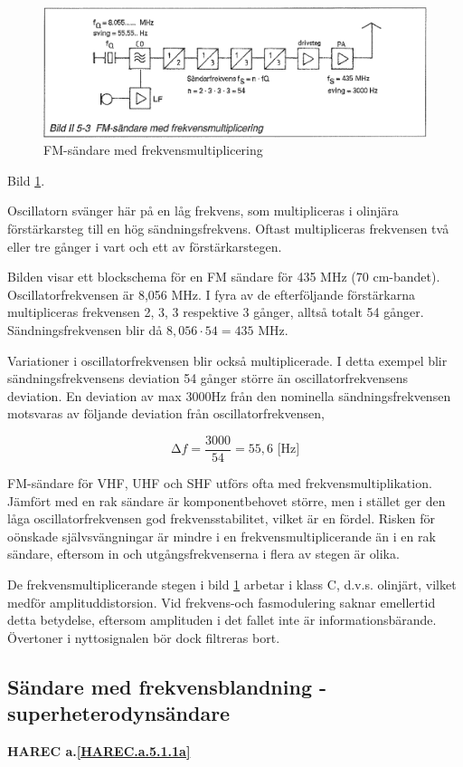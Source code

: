 \begin{figure}
  \includegraphics[width=\textwidth]{images/bild_2_5-03}
  \caption{FM-sändare med frekvensmultiplicering}
  \label{fig:bildII5-3}
\end{figure}

Bild \ref{fig:bildII5-3}.

Oscillatorn svänger här på en låg frekvens, som multipliceras i
olinjära förstärkarsteg till en hög sändningsfrekvens. Oftast
multipliceras frekvensen två eller tre gånger i vart och ett av
förstärkarstegen.

Bilden visar ett blockschema för en FM sändare för 435 MHz (70
cm-bandet). Oscillatorfrekvensen är 8,056 MHz. I fyra av de
efterföljande förstärkarna multipliceras frekvensen 2, 3, 3 respektive
3 gånger, alltså totalt 54 gånger. Sändningsfrekvensen blir då \(8,056
\cdot 54 = 435\) MHz.

Variationer i oscillatorfrekvensen blir också multiplicerade. I detta
exempel blir sändningsfrekvensens deviation 54 gånger större än
oscillatorfrekvensens deviation. En deviation av max 3000Hz från den
nominella sändningsfrekvensen motsvaras av följande deviation från
oscillatorfrekvensen,

\[∆f = \frac{3000}{54} = 55,6\text{ [Hz]}\]

FM-sändare för VHF, UHF och SHF utförs ofta med
frekvensmultiplikation. Jämfört med en rak sändare är komponentbehovet
större, men i stället ger den låga oscillatorfrekvensen god
frekvensstabilitet, vilket är en fördel. Risken för oönskade
självsvängningar är mindre i en frekvensmultiplicerande än i en rak
sändare, eftersom in och utgångsfrekvenserna i flera av stegen är
olika.

De frekvensmultiplicerande stegen i bild \ref{fig:bildII5-3} arbetar i klass C,
d.v.s. olinjärt, vilket medför amplituddistorsion. Vid frekvens-och
fasmodulering saknar emellertid detta betydelse, eftersom amplituden i
det fallet inte är informationsbärande. Övertoner i nyttosignalen bör
dock filtreras bort.

\subsection{Sändare med frekvensblandning - superheterodynsändare}
\textbf{HAREC a.\ref{HAREC.a.5.1.1a}\label{myHAREC.a.5.1.1a}}

